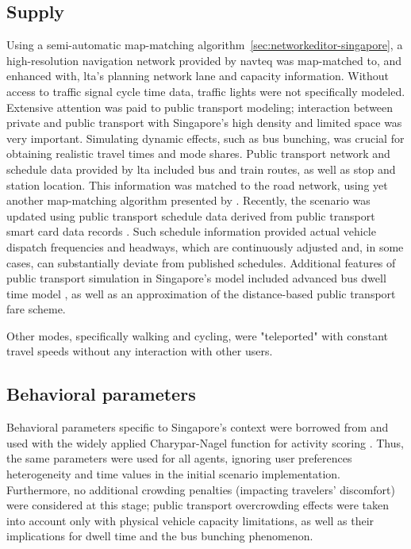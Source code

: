 \subsection{Supply}
Using a semi-automatic map-matching algorithm~\ref{sec:networkeditor-singapore}, a high-resolution navigation network provided by \gls{navteq} was map-matched to, and enhanced with, \gls{lta}'s planning network lane and capacity information. Without access to traffic signal cycle time data, traffic lights were not specifically modeled. Extensive attention was paid to public transport modeling; interaction between private and public transport with Singapore’s high density and limited space was very important. Simulating dynamic effects, such as bus bunching, was crucial for obtaining realistic travel times and mode shares. Public transport network and schedule data provided by \gls{lta} included bus and train routes, as well as stop and station location. This information was matched to the road network, using yet another map-matching algorithm presented by \citet[][]{Ordonez_HKSTS_2011, Ordonez_Webpage_2011_4}. Recently, the scenario was updated using public transport schedule data derived from public transport smart card data records \citet[][]{Fourie_TechRep_FCL_2014}. Such schedule information provided actual vehicle dispatch frequencies and headways, which are continuously adjusted and, in some cases, can substantially deviate from published schedules. Additional features of public transport simulation in Singapore’s model included advanced bus dwell time model \citep[][]{SunEtAl_TransResA_2014}, as well as an approximation of the distance-based public transport fare scheme.

Other modes, specifically walking and cycling, were "teleported" with constant travel speeds without any interaction with other users. 

\subsection{Behavioral parameters}
Behavioral parameters specific to Singapore's context were borrowed from \citet[][]{LTA_unpub_2009} and used with the widely applied Charypar-Nagel function for activity scoring \citet[][]{CharyparNagel2005ga4acts}. Thus, the same parameters were used for all agents, ignoring user preferences heterogeneity and time values in the initial scenario implementation. Furthermore, no additional crowding penalties (impacting travelers' discomfort) were considered at this stage; public transport overcrowding effects were taken into account only with physical vehicle capacity limitations, as well as their implications for dwell time and the bus bunching phenomenon. 

